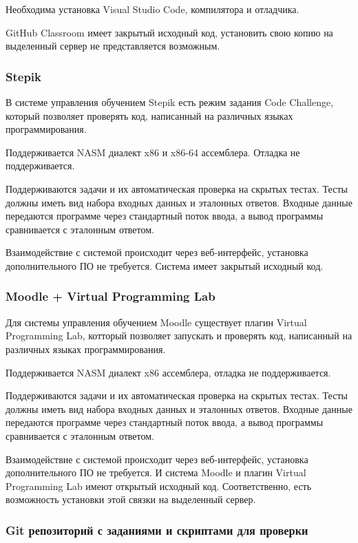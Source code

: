 \documentclass[a4paper,article,14pt]{extarticle}
\begin{document}
Необходима установка Visual Studio Code, компилятора и отладчика.

GitHub Classroom имеет закрытый исходный код, установить свою копию на выделенный сервер не представляется возможным.

\subsubsection{Stepik}

В системе управления обучением Stepik есть режим задания Code Challenge, который позволяет проверять код, написанный на различных языках программирования.

Поддерживается NASM диалект x86 и x86-64 ассемблера. Отладка не поддерживается.

Поддерживаются задачи и их автоматическая проверка на скрытых тестах. Тесты должны иметь вид набора входных данных и эталонных ответов. Входные данные передаются программе через стандартный поток ввода, а вывод программы сравнивается с эталонным ответом.

Взаимодействие с системой происходит через веб-интерфейс, установка дополнительного ПО не требуется. Система имеет закрытый исходный код.

\subsubsection{Moodle + Virtual Programming Lab}

Для системы управления обучением Moodle существует плагин Virtual Programming Lab, котторый позволяет запускать и проверять код, написанный на различных языках программирования.

Поддерживается NASM диалект x86 ассемблера, отладка не поддерживается.

Поддерживаются задачи и их автоматическая проверка на скрытых тестах. Тесты должны иметь вид набора входных данных и эталонных ответов. Входные данные передаются программе через стандартный поток ввода, а вывод программы сравнивается с эталонным ответом.

Взаимодействие с системой происходит через веб-интерфейс, установка дополнительного ПО не требуется. И система Moodle и плагин Virtual Programming Lab имеют открытый исходный код. Соответственно, есть возможность установки этой связки на выделенный сервер.

\subsubsection{Git репозиторий с заданиями и скриптами для проверки}
\end{document}
